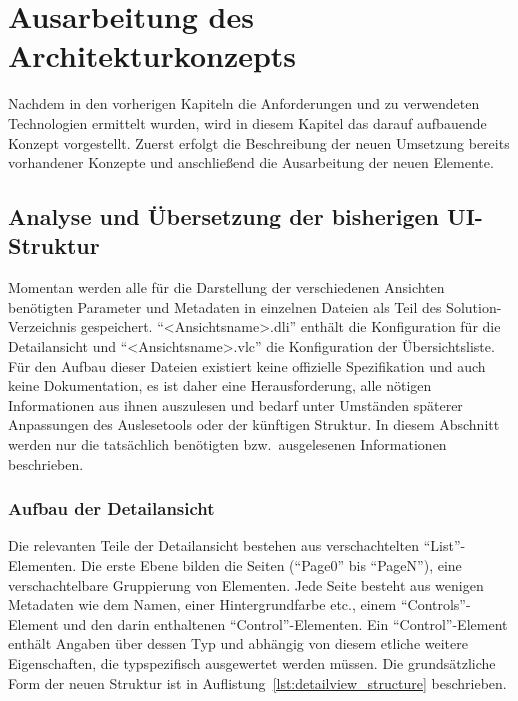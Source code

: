 \chapter{Ausarbeitung des Architekturkonzepts}\label{chap:concept}
Nachdem in den vorherigen Kapiteln die Anforderungen und zu verwendeten Technologien ermittelt wurden, wird in diesem Kapitel das darauf aufbauende Konzept vorgestellt. Zuerst erfolgt die Beschreibung der neuen Umsetzung bereits vorhandener Konzepte und anschließend die Ausarbeitung der neuen Elemente.

\section{Analyse und Übersetzung der bisherigen UI-Struktur}\label{sec:ui_structure_translation}
Momentan werden alle für die Darstellung der verschiedenen Ansichten benötigten Parameter und Metadaten in einzelnen Dateien als Teil des Solution-Verzeichnis gespeichert. \enquote{<Ansichtsname>.dli} enthält die Konfiguration für die Detailansicht und \enquote{<Ansichtsname>.vlc} die Konfiguration der Übersichtsliste. Für den Aufbau dieser Dateien existiert keine offizielle Spezifikation und auch keine Dokumentation, es ist daher eine Herausforderung, alle nötigen Informationen aus ihnen auszulesen und bedarf unter Umständen späterer Anpassungen des Auslesetools oder der künftigen Struktur. In diesem Abschnitt werden nur die tatsächlich benötigten bzw.\ ausgelesenen Informationen beschrieben.

\subsection{Aufbau der Detailansicht}
Die relevanten Teile der Detailansicht bestehen aus verschachtelten \enquote{List}-Elementen. Die erste Ebene bilden die Seiten (\enquote{Page0} bis \enquote{PageN}), eine verschachtelbare Gruppierung von Elementen. Jede Seite besteht aus wenigen Metadaten wie dem Namen, einer Hintergrundfarbe etc., einem \enquote{Controls}-Element und den darin enthaltenen \enquote{Control}-Elementen. Ein \enquote{Control}-Element enthält Angaben über dessen Typ und abhängig von diesem etliche weitere Eigenschaften, die typspezifisch ausgewertet werden müssen. Die grundsätzliche Form der neuen Struktur ist in Auflistung~\ref{lst:detailview_structure} beschrieben.



